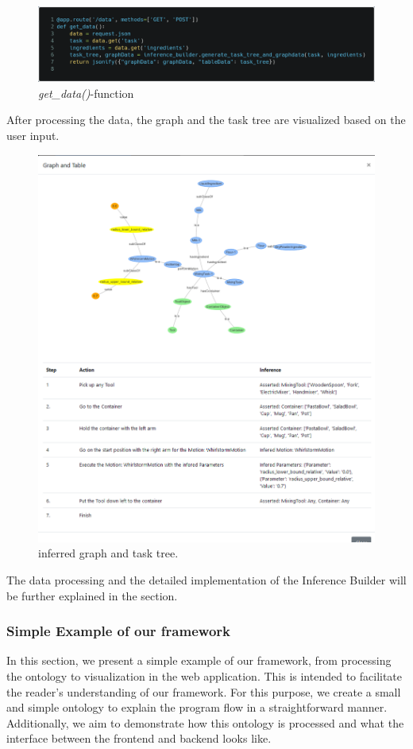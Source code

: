 \begin{figure}[H]
    \includegraphics[scale=0.23]{Graphics/get_data.png}
    \caption{\textit{get\_data()}-function}
\end{figure}

After processing the data, the graph and the task tree are visualized based on the user input.

\begin{figure}[H]
    \includegraphics[scale=0.5]{Graphics/new_inference_graph.png}
    \caption{inferred graph and task tree.}
    \label{fig:graph_inferred}
\end{figure}

The data processing and the detailed implementation of the Inference Builder will be further explained in the  section.

\subsubsection{Simple Example of our framework}
\label{sec:Introducing the framework with a trivial example}
In this section, we present a simple example of our framework, from processing the ontology to visualization in the web application. This is intended to facilitate the reader's understanding of our framework. For this purpose, we create a small and simple ontology to explain the program flow in a straightforward manner. Additionally, we aim to demonstrate how this ontology is processed and what the interface between the frontend and backend looks like.

